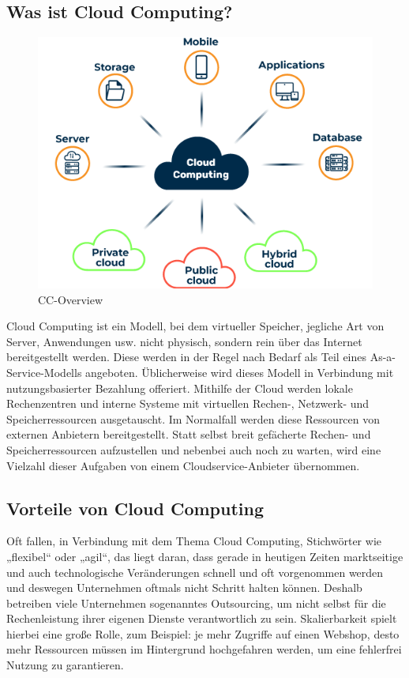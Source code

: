 \subsection{Was ist Cloud Computing?}

\begin{figure}[h]
    \centering
    \includegraphics[scale=0.9]{sections/cloud-computing/images/cc.png}
    \caption{CC-Overview}
\end{figure}

Cloud Computing ist ein Modell, bei dem virtueller Speicher, jegliche Art von Server, Anwendungen usw. nicht physisch, sondern rein über das Internet bereitgestellt werden. Diese werden in der Regel nach Bedarf als Teil eines As-a-Service-Modells angeboten. Üblicherweise wird dieses Modell in Verbindung mit nutzungsbasierter Bezahlung offeriert. Mithilfe der Cloud werden lokale Rechenzentren und interne Systeme mit virtuellen Rechen-, Netzwerk- und Speicherressourcen ausgetauscht. Im Normalfall werden diese Ressourcen von externen Anbietern bereitgestellt. Statt selbst breit gefächerte Rechen- und Speicherressourcen aufzustellen und nebenbei auch noch zu warten, wird eine Vielzahl dieser Aufgaben von einem Cloudservice-Anbieter übernommen.

\subsection{Vorteile von Cloud Computing}

Oft fallen, in Verbindung mit dem Thema Cloud Computing, Stichwörter wie „flexibel“ oder „agil“, das liegt daran, dass gerade in heutigen Zeiten marktseitige und auch technologische Veränderungen schnell und oft vorgenommen werden und deswegen Unternehmen oftmals nicht Schritt halten können. Deshalb betreiben viele Unternehmen sogenanntes Outsourcing, um nicht selbst für die Rechenleistung ihrer eigenen Dienste verantwortlich zu sein. Skalierbarkeit spielt hierbei eine große Rolle, zum Beispiel: je mehr Zugriffe auf einen Webshop, desto mehr Ressourcen müssen im Hintergrund hochgefahren werden, um eine fehlerfrei Nutzung zu garantieren.

